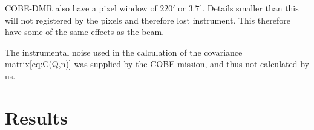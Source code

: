 \documentclass{emulateapj}
\begin{document}
COBE-DMR also have a pixel window of $220'$ or $3.7^\circ$. Details smaller than this will not registered by the pixels and therefore lost instrument. This therefore have some of the same effects as the beam.

The instrumental noise used in the calculation of the covariance matrix\eqref{eq:C(Q,n)} was supplied by the COBE mission, and thus not calculated by us.


%

\section{Results}
\label{sec:results}
\end{document}
